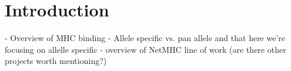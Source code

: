 \section*{Introduction}
- Overview of MHC binding
- Allele specific vs. pan allele and that here we're focusing on allelle specific
- overview of NetMHC line of work (are there other projects worth mentioning?)